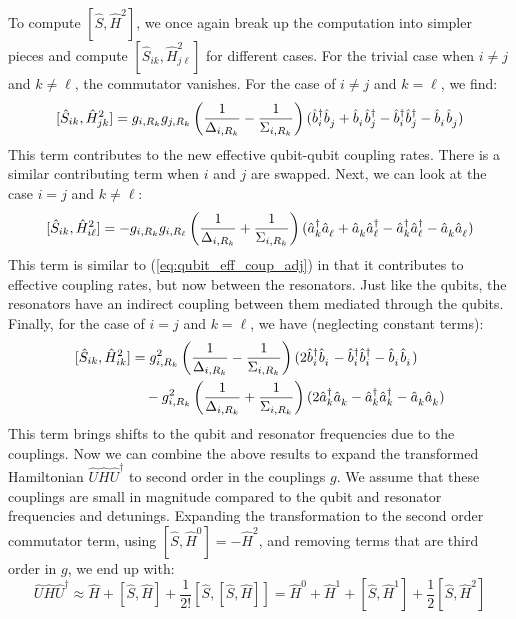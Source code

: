 To compute $[\hat{S}, \hat{H}^2]$, we once again break up the computation into simpler pieces and compute $[\hat{S}_{ik}, \hat{H}^2_{j\ell}]$ for different cases. For the trivial case when $i\neq j$ and $k\neq\ell$, the commutator vanishes. For the case of $i\neq j$ and $k=\ell$, we find:
\begin{equation}\label{eq:qubit_eff_coup_adj}
    [\hat{S}_{ik}, \hat{H}^2_{jk}] = g_{i,R_k}g_{j,R_k} \left( \frac{1}{\Delta_{i,R_k}} - \frac{1}{\Sigma_{i,R_k}} \right)(\opbd_i\opb_j + \opb_i\opbd_j - \opbd_i\opbd_j - \opb_i\opb_j)
\end{equation}
This term contributes to the new effective qubit-qubit coupling rates. There is a similar contributing term when $i$ and $j$ are swapped. Next, we can look at the case $i=j$ and $k\neq \ell$:
\begin{equation}\label{eq:res_eff_coup_adj}
    [\hat{S}_{ik}, \hat{H}^2_{i\ell}] = -g_{i,R_k}g_{i,R_\ell}\left(  \frac{1}{\Delta_{i,R_k}} + \frac{1}{\Sigma_{i,R_k}}  \right) (\opad_k\opa_\ell + \opa_k\opad_\ell - \opad_k\opad_\ell - \opa_k\opa_\ell)
\end{equation}
This term is similar to (\ref{eq:qubit_eff_coup_adj}) in that it contributes to effective coupling rates, but now between the resonators. Just like the qubits, the resonators have an indirect coupling between them mediated through the qubits. Finally, for the case of $i=j$ and $k=\ell$, we have (neglecting constant terms):
\begin{align}
\begin{split}\label{eq:qubit_res_shifts}
    [\hat{S}_{ik}, \hat{H}^2_{ik}] &= g^2_{i,R_k}\left( \frac{1}{\Delta_{i,R_k}} - \frac{1}{\Sigma_{i,R_k}} \right)(2\opbd_i\opb_i - \opbd_i\opbd_i - \opb_i\opb_i) \\
    & \quad - g^2_{i,R_k}\left( \frac{1}{\Delta_{i,R_k}} + \frac{1}{\Sigma_{i,R_k}} \right)(2\opad_k\opa_k - \opad_k\opad_k - \opa_k\opa_k)
\end{split}
\end{align}
This term brings shifts to the qubit and resonator frequencies due to the couplings. Now we can combine the above results to expand the transformed Hamiltonian $\hat{U} \hat{H} \hat{U}^\dag$ to second order in the couplings $g$. We assume that these couplings are small in magnitude compared to the qubit and resonator frequencies and detunings. Expanding the transformation to the second order commutator term, using $[\hat{S}, \hat{H}^0] = -\hat{H}^2$, and removing terms that are third order in $g$, we end up with:
\begin{equation}
    \hat{U} \hat{H} \hat{U}^\dag \approx \hat{H} + [\hat{S},\hat{H}] + \frac{1}{2!}[\hat{S},[\hat{S},\hat{H}]] = \hat{H}^0 + \hat{H}^1 + [\hat{S}, \hat{H}^1] + \frac{1}{2}[\hat{S}, \hat{H}^2]
\end{equation}
